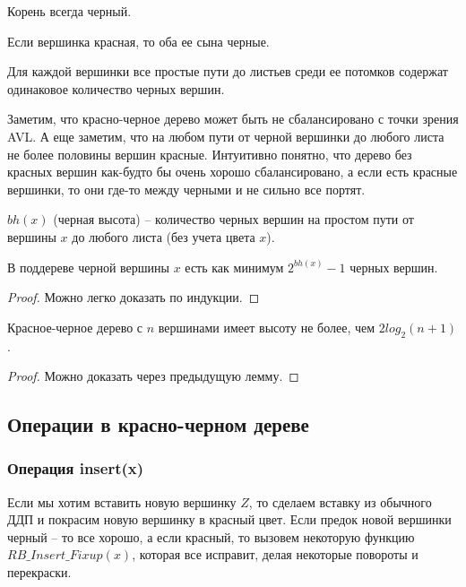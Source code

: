\begin{invariant}
    Корень всегда черный.
\end{invariant}
\begin{invariant}
    Если вершинка красная, то оба ее сына черные.
\end{invariant}
\begin{invariant}
    Для каждой вершинки все простые пути до листьев среди ее потомков содержат одинаковое количество черных вершин.
\end{invariant}

Заметим, что красно-черное дерево может быть не сбалансировано с точки зрения AVL. А еще заметим, что на любом пути от черной вершинки до любого листа не более половины вершин красные. Интуитивно понятно, что дерево без красных вершин как-будто бы очень хорошо сбалансировано, а если есть красные вершинки, то они где-то между черными и не сильно все портят.

\begin{definition}
    $bh(x)$ (черная высота) -- количество черных вершин на простом пути от вершины $x$ до любого листа (без учета цвета $x$).
\end{definition}

\begin{lemma}
    В поддереве черной вершины $x$ есть как минимум $2^{bh(x)} - 1$ черных вершин.
\end{lemma}
\begin{proof}
    Можно легко доказать по индукции.
\end{proof}

\begin{lemma}
    Красное-черное дерево с $n$ вершинами имеет высоту не более, чем $2log_2(n+1)$.
\end{lemma}
\begin{proof}
    Можно доказать через предыдущую лемму.
\end{proof}



\subsection{Операции в красно-черном дереве}



\subsubsection{Операция insert(x)}

Если мы хотим вставить новую вершинку $Z$, то сделаем вставку из обычного ДДП и покрасим новую вершинку в красный цвет. Если предок новой вершинки черный -- то все хорошо, а если красный, то вызовем некоторую функцию $RB\_Insert\_Fixup(x)$, которая все исправит, делая некоторые повороты и перекраски. \\

